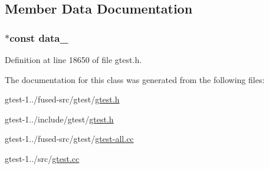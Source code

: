 \subsection{\-Member \-Data \-Documentation}
\hypertarget{classtesting_1_1internal_1_1AssertHelper_acb74cc67a1b0371db63e76b73ebf3a13}{
\subsubsection[{data\-\_\-}]{ $\ast$const {\bf data\-\_\-}}}\label{d7/d85/classtesting_1_1internal_1_1AssertHelper_acb74cc67a1b0371db63e76b73ebf3a13}


\-Definition at line 18650 of file gtest.\-h.



\-The documentation for this class was generated from the following files\-:\begin{DoxyCompactItemize}
\item 
gtest-\/1../fused-\/src/gtest/\hyperlink{fused-src_2gtest_2gtest_8h}{gtest.\-h}\item 
gtest-\/1../include/gtest/\hyperlink{include_2gtest_2gtest_8h}{gtest.\-h}\item 
gtest-\/1../fused-\/src/gtest/\hyperlink{fused-src_2gtest_2gtest-all_8cc}{gtest-\/all.\-cc}\item 
gtest-\/1../src/\hyperlink{gtest_8cc}{gtest.\-cc}\end{DoxyCompactItemize}
